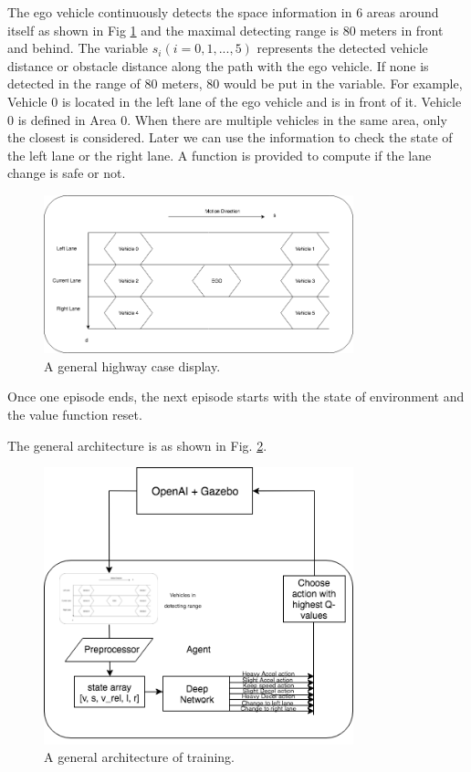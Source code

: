 The ego vehicle continuously detects the space information in 6 areas around itself as shown in Fig \ref{fig:highway} and the maximal detecting range is 80 meters in front and behind. The variable $s_i (i = 0,1,...,5)$ represents the detected vehicle distance or obstacle distance along the path with the ego vehicle. If none is detected in the range of 80 meters, 80 would be put in the variable. For example, Vehicle 0 is located in the left lane of the ego vehicle and is in front of it. Vehicle 0 is defined in Area 0. When there are multiple vehicles in the same area, only the closest is considered. Later we can use the information to check the state of the left lane or the right lane. A function is provided to compute if the lane change is safe or not.

\begin{figure}[h]
\centering
\includegraphics[width=0.8\textwidth]{figs/ch4/Highway-Display}
\caption{A general highway case display.}
\label{fig:highway}
\end{figure}

Once one episode ends, the next episode starts with the state of environment and the value function reset.

The general architecture is as shown in Fig. \ref{fig:diagram}.

\begin{figure}[h]
\centering
\includegraphics[width=0.8\textwidth]{figs/ch4/diagram}
\caption{A general architecture of training.}
\label{fig:diagram}
\end{figure}

